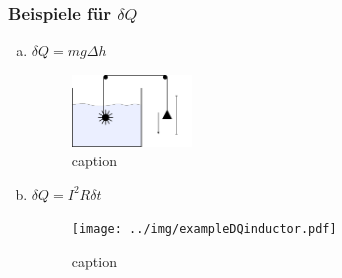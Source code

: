 \subsubsection{Beispiele für $\delta Q$}
\begin{enumerate}[a)]
    \item $\delta Q = m g \Delta h$
    \begin{figure}[H]
        \begin{center}
            \includegraphics[width=0.3\textwidth]{../img/exampleDQpot.pdf}
            \caption{caption}  %
            \label{img:exampleDQpot}
        \end{center}
    \end{figure}
    
    \item  $\delta Q = I^2 R \delta t$
    \begin{figure}[H]
        \begin{center}
            \texttt{[image: ../img/exampleDQinductor.pdf]}
            \caption{caption}  %
            \label{img:exampleDQcoil}
        \end{center}
    \end{figure}
\end{enumerate}
